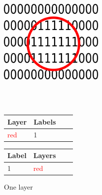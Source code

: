 \begin{figure}[ht]
	\begin{minipage}[b]{\linewidth}
		\centering
		\includegraphics[width=0.45\textwidth]{images/layers2}
	\end{minipage}
	\\\\
	\begin{minipage}[b]{0.48\linewidth}
		\hfill
		\begin{tabular}[b]{|l|l|l|l|}
			\hline
			Layer & Labels \\
			\hline
			\textcolor{red}{red}       & 1 \\
			\hline
		\end{tabular}
	\end{minipage}
	\hspace{0.5cm}
	\begin{minipage}[b]{0.5\linewidth}
		\begin{tabular}[b]{|l|l|l|l|}
			\hline
			Label & Layers \\
			\hline
			1       & \textcolor{red}{red} \\
			\hline
		\end{tabular}
		\hfill
	\end{minipage}
	\caption{One layer\label{fig:layer2}}
\end{figure}



